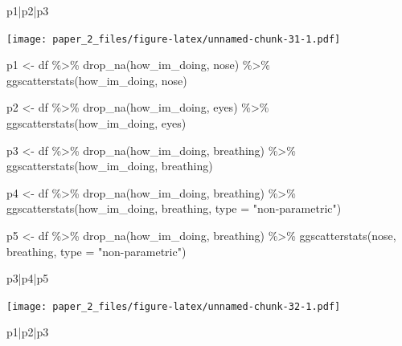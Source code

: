 \documentclass[
]{article}
\newenvironment{Shaded}{\begin{snugshade}}{\end{snugshade}}
\newcommand{\AttributeTok}[1]{\textcolor[rgb]{0.77,0.63,0.00}{#1}}
\newcommand{\FunctionTok}[1]{\textcolor[rgb]{0.00,0.00,0.00}{#1}}
\newcommand{\NormalTok}[1]{#1}
\newcommand{\OtherTok}[1]{\textcolor[rgb]{0.56,0.35,0.01}{#1}}
\newcommand{\SpecialCharTok}[1]{\textcolor[rgb]{0.00,0.00,0.00}{#1}}
\newcommand{\StringTok}[1]{\textcolor[rgb]{0.31,0.60,0.02}{#1}}
\begin{document}
\begin{Shaded}
\begin{Highlighting}[]
\NormalTok{p1}\SpecialCharTok{|}\NormalTok{p2}\SpecialCharTok{|}\NormalTok{p3 }
\end{Highlighting}
\end{Shaded}

\texttt{[image: paper\_2\_files/figure-latex/unnamed-chunk-31-1.pdf]}

\begin{Shaded}
\begin{Highlighting}[]
\NormalTok{p1 }\OtherTok{\textless{}{-}}\NormalTok{ df }\SpecialCharTok{\%\textgreater{}\%} 
  \FunctionTok{drop\_na}\NormalTok{(how\_im\_doing,}
\NormalTok{          nose) }\SpecialCharTok{\%\textgreater{}\%}
  \FunctionTok{ggscatterstats}\NormalTok{(how\_im\_doing, nose)}

\NormalTok{p2 }\OtherTok{\textless{}{-}}\NormalTok{ df }\SpecialCharTok{\%\textgreater{}\%} 
  \FunctionTok{drop\_na}\NormalTok{(how\_im\_doing,}
\NormalTok{          eyes) }\SpecialCharTok{\%\textgreater{}\%}
  \FunctionTok{ggscatterstats}\NormalTok{(how\_im\_doing, eyes)}

\NormalTok{p3 }\OtherTok{\textless{}{-}}\NormalTok{ df }\SpecialCharTok{\%\textgreater{}\%} 
  \FunctionTok{drop\_na}\NormalTok{(how\_im\_doing,}
\NormalTok{          breathing) }\SpecialCharTok{\%\textgreater{}\%}
  \FunctionTok{ggscatterstats}\NormalTok{(how\_im\_doing, breathing)}


\NormalTok{p4 }\OtherTok{\textless{}{-}}\NormalTok{ df }\SpecialCharTok{\%\textgreater{}\%} 
  \FunctionTok{drop\_na}\NormalTok{(how\_im\_doing,}
\NormalTok{          breathing) }\SpecialCharTok{\%\textgreater{}\%}
  \FunctionTok{ggscatterstats}\NormalTok{(how\_im\_doing, breathing, }\AttributeTok{type =} \StringTok{"non{-}parametric"}\NormalTok{)}


\NormalTok{p5 }\OtherTok{\textless{}{-}}\NormalTok{ df }\SpecialCharTok{\%\textgreater{}\%} 
  \FunctionTok{drop\_na}\NormalTok{(how\_im\_doing,}
\NormalTok{          breathing) }\SpecialCharTok{\%\textgreater{}\%}
  \FunctionTok{ggscatterstats}\NormalTok{(nose, breathing, }\AttributeTok{type =} \StringTok{"non{-}parametric"}\NormalTok{)}


\NormalTok{p3}\SpecialCharTok{|}\NormalTok{p4}\SpecialCharTok{|}\NormalTok{p5}
\end{Highlighting}
\end{Shaded}

\texttt{[image: paper\_2\_files/figure-latex/unnamed-chunk-32-1.pdf]}

\begin{Shaded}
\begin{Highlighting}[]
\NormalTok{p1}\SpecialCharTok{|}\NormalTok{p2}\SpecialCharTok{|}\NormalTok{p3}
\end{Highlighting}
\end{Shaded}
\end{document}
